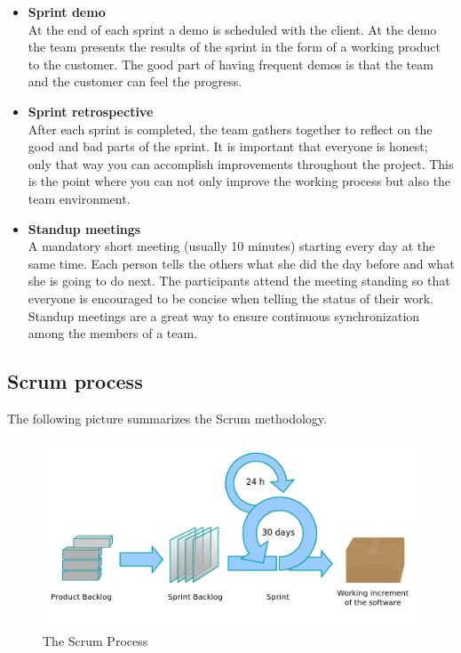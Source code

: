 \begin{itemize}
\item{\textbf{Sprint demo}}\\
At the end of each sprint a demo is scheduled with the client. At the demo the team presents the results of the sprint 
in the form of a working product to the customer. The good part of having frequent demos is that the team and the customer can
feel the progress. 

\item{\textbf{Sprint retrospective}}\\
After each sprint is completed, the team gathers together to reflect on the good and bad parts of the sprint.
It is important that everyone is honest; only that way you can accomplish improvements throughout the project.
This is the point where you can not only improve the working process but also the team environment.

\item{\textbf{Standup meetings}}\\
A mandatory short meeting (usually 10 minutes) starting every day at the same time.
Each person tells the others what she did the day before and what she is going to do
next. The participants attend the meeting standing so that everyone is encouraged to be concise
when telling the status of their work. Standup meetings are a great way to ensure continuous
synchronization among the members of a team.

\end{itemize}
\pagebreak

\subsection{Scrum process}
The following picture summarizes the Scrum methodology.

\begin{figure}[!h]
\centering
\includegraphics[scale=0.35]{graphics/scrum.png}
\caption{The Scrum Process}\label{fig:scrum_process}
\end{figure}
